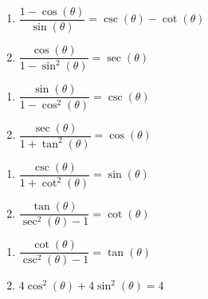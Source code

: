 \begin{multicols}{2}

\begin{enumerate}

\setcounter{enumi}{\value{HW}}

\item $\dfrac{1 - \cos(\theta)}{\sin(\theta)} = \csc(\theta) - \cot(\theta)$
\item  $\dfrac{\cos(\theta)}{1 - \sin^{2}(\theta)} = \sec(\theta)$

\setcounter{HW}{\value{enumi}}

\end{enumerate}

\end{multicols}

\begin{multicols}{2}

\begin{enumerate}

\setcounter{enumi}{\value{HW}}

\item  $\dfrac{\sin(\theta)}{1 - \cos^{2}(\theta)} = \csc(\theta)$
\item  $\dfrac{\sec(\theta)}{1 + \tan^{2}(\theta)} = \cos(\theta)$

\setcounter{HW}{\value{enumi}}

\end{enumerate}

\end{multicols}

\begin{multicols}{2}

\begin{enumerate}

\setcounter{enumi}{\value{HW}}

\item  $\dfrac{\csc(\theta)}{1 + \cot^{2}(\theta)} = \sin(\theta)$
\item   $\dfrac{\tan(\theta)}{\sec^{2}(\theta) - 1} = \cot(\theta)$

\setcounter{HW}{\value{enumi}}

\end{enumerate}

\end{multicols}

\begin{multicols}{2}

\begin{enumerate}

\setcounter{enumi}{\value{HW}}

\item   $\dfrac{\cot(\theta)}{\csc^{2}(\theta) - 1} = \tan(\theta)$
\item $4 \cos^{2}(\theta) + 4 \sin^{2}(\theta) = 4$

\setcounter{HW}{\value{enumi}}

\end{enumerate}

\end{multicols}

